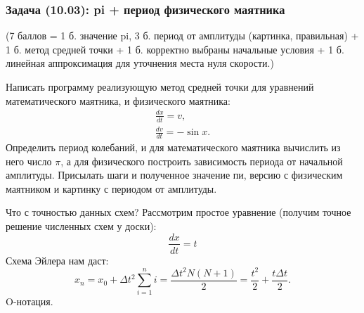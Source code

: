 \documentclass{book}
\begin{document}
\subsubsection{Задача (10.03): pi + период физического маятника}
(7 баллов = 1 б. значение pi, 3 б.
период от амплитуды (картинка, правильная) + 1 б. метод средней точки + 1 б. корректно выбраны начальные
условия + 1 б. линейная аппроксимация для уточнения места нуля скорости.)

Написать программу реализующую метод средней точки для уравнений математического маятника, и
физического маятника:
\begin{eqnarray}
    \frac{dx}{dt} = v, \\
    \frac{dv}{dt} = - \sin x.
\end{eqnarray}
Определить период колебаний, и для математического маятника вычислить из него число $\pi$, а для
физического построить зависимость периода от начальной амплитуды. Присылать шаги и полученное
значение пи, версию с физическим маятником и картинку с периодом от амплитуды.

Что с точностью данных схем? Рассмотрим простое уравнение (получим точное решение численных схем у
доски):
\begin{equation}
    \frac{dx}{dt} = t
\end{equation}
Схема Эйлера нам даст:
\begin{equation}
    x_n = x_0 + \Delta t^2 \sum_{i = 1}^n i = \frac{\Delta t^2 N (N + 1)}{2} = \frac{t^2}{2} +
    \frac{t \Delta t}{2}.
\end{equation}
O-нотация.
\end{document}
